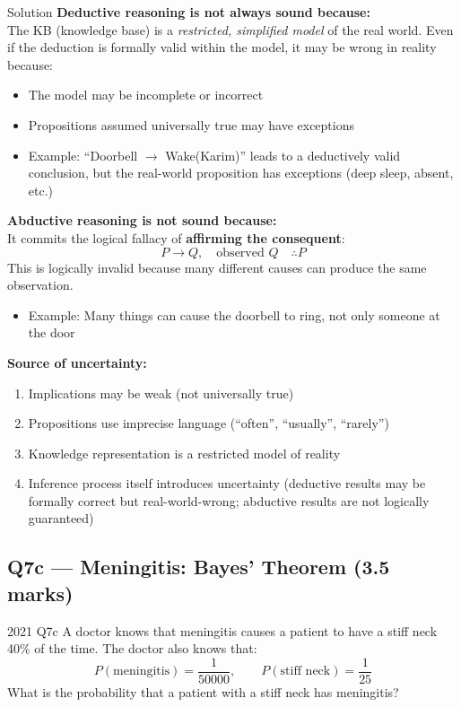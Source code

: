 \documentclass[12pt,a4paper]{article}
\begin{document}
\begin{solbox}{Solution}
\textbf{Deductive reasoning is not always sound because:}\\
The KB (knowledge base) is a \textit{restricted, simplified model} of the real world. Even if the deduction is formally valid within the model, it may be wrong in reality because:
\begin{itemize}[noitemsep]
  \item The model may be incomplete or incorrect
  \item Propositions assumed universally true may have exceptions
  \item Example: ``Doorbell $\to$ Wake(Karim)'' leads to a deductively valid conclusion, but the real-world proposition has exceptions (deep sleep, absent, etc.)
\end{itemize}

\textbf{Abductive reasoning is not sound because:}\\
It commits the logical fallacy of \textbf{affirming the consequent}:
\[P \to Q,\quad \text{observed } Q \quad \therefore P\]
This is logically invalid because many different causes can produce the same observation.
\begin{itemize}[noitemsep]
  \item Example: Many things can cause the doorbell to ring, not only someone at the door
\end{itemize}

\textbf{Source of uncertainty:}
\begin{enumerate}[noitemsep]
  \item Implications may be weak (not universally true)
  \item Propositions use imprecise language (``often'', ``usually'', ``rarely'')
  \item Knowledge representation is a restricted model of reality
  \item Inference process itself introduces uncertainty (deductive results may be formally correct but real-world-wrong; abductive results are not logically guaranteed)
\end{enumerate}
\end{solbox}

\subsection{Q7c --- Meningitis: Bayes' Theorem (3.5 marks)}

\begin{qbox}{2021 Q7c}
A doctor knows that meningitis causes a patient to have a stiff neck 40\% of the time. The doctor also knows that:
\[ P(\text{meningitis}) = \frac{1}{50000}, \qquad P(\text{stiff neck}) = \frac{1}{25} \]
What is the probability that a patient with a stiff neck has meningitis?
\end{qbox}
\end{document}
